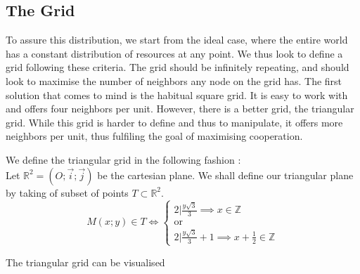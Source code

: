 \documentclass[12pt]{article}
\begin{document}
\subsection{The Grid}
To assure this distribution, we start from the ideal case, where the entire world has a constant distribution of resources at any point. 
We thus look to define a grid following these criteria. The grid should be infinitely repeating, and should look to maximise the number of neighbors any node on the grid has.
The first solution that comes to mind is the habitual square grid. It is easy to work with and offers four neighbors per unit. 
However, there is a better grid, the triangular grid. While this grid is harder to define and thus to manipulate, it offers more neighbors per unit, thus fulfiling the goal of maximising cooperation. 
\begin{definition}\label{def:tgrid}
    We define the triangular grid in the following fashion : \\
    Let \(\mathbb{R}^{2} = (O;\vec{i};\vec{j})\) be the cartesian plane. We shall define our triangular plane by taking of subset of points \(T \subset \mathbb{R}^{2}\).\\
    \[
        M(x;y) \in T \iff \begin{cases}
            2|\frac{y\sqrt{3}}{3} \implies x \in \mathbb{Z}\\
            \text{or}\\
            2| \frac{y\sqrt{3}}{3} + 1 \implies x +\frac{1}{2} \in \mathbb{Z}
        \end{cases}
    \]  
\end{definition}

The triangular grid can be visualised
\end{document}
